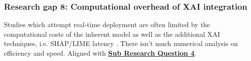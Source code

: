 
\subsubsection*{Research gap 8: Computational overhead of XAI integration}\label{research-gap-8}
Studies which attempt real-time deployment are often limited by the computational costs of the inherent model as well as the additional XAI techniques, i.e. SHAP/LIME latency \citep{kapoor2024comparative}. There isn't much numerical analysis on efficiency and speed. Aligned with \hyperref[sub-research-q4]{\uline{\textbf{Sub Research Question 4}}}.
